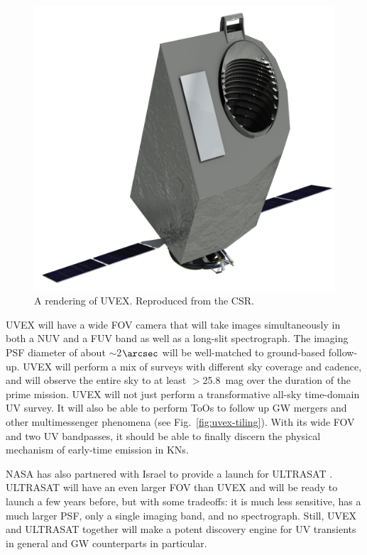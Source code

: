 \documentclass[twocolumn,times]{aastex631}
\begin{document}
\begin{figure}
    \includegraphics[width=\columnwidth]{figures/UVEXrender}
    \caption{\label{fig:render}A rendering of \ac{UVEX}. Reproduced from the \ac{CSR}.}
\end{figure}

\ac{UVEX} will have a wide \ac{FOV} camera that will take images simultaneously in both a \ac{NUV} and a \ac{FUV} band as well as a long-slit spectrograph. The imaging \ac{PSF} diameter of about $\sim$2$\arcsec$ will be well-matched to ground-based follow-up. \ac{UVEX} will perform a mix of surveys with different sky coverage and cadence, and will observe the entire sky to at least $>$25.8~mag over the duration of the prime mission. \ac{UVEX} will not just perform a transformative all-sky time-domain \ac{UV} survey. It will also be able to perform \acp{ToO} to follow up \ac{GW} mergers and other multimessenger phenomena (see Fig.~\ref{fig:uvex-tiling}). With its wide \ac{FOV} and two \ac{UV} bandpasses, it should be able to finally discern the physical mechanism of early-time emission in \acp{KN}.

NASA has also partnered with Israel to provide a launch for ULTRASAT \citep{2024ApJ...964...74S}. ULTRASAT will have an even larger \ac{FOV} than \ac{UVEX} and will be ready to launch a few years before, but with some tradeoffs: it is much less sensitive, has a much larger \ac{PSF}, only a single imaging band, and no spectrograph. Still, \ac{UVEX} and ULTRASAT together will make a potent discovery engine for \ac{UV} transients in general and \ac{GW} counterparts in particular.
\end{document}
